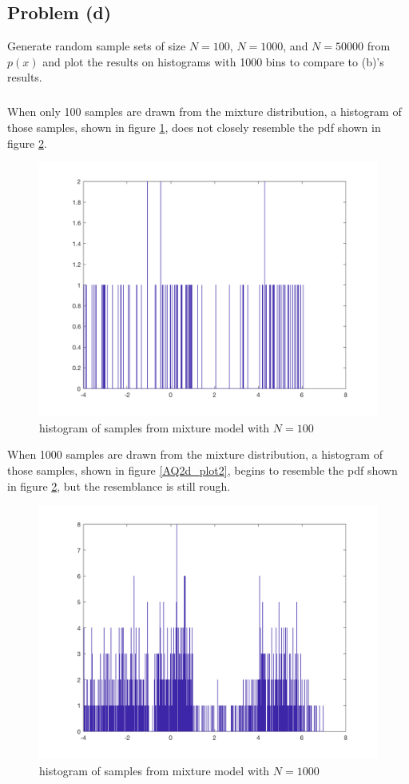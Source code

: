 \documentclass[11pt]{article}
\begin{document}
\subsection*{Problem (d)}
Generate random sample sets of size $N=100$, $N=1000$, and $N=50000$ from $p(x)$ and plot the results on histograms with 1000 bins to compare to (b)'s results.

\subparagraph*{}
When only 100 samples are drawn from the mixture distribution, a histogram of those samples, shown in figure \ref{AQ2d_plot1}, does not closely resemble the pdf shown in figure \ref{AQ2_plot1}.
\begin{figure}[h!]
	\centering
	\includegraphics[width=0.6\linewidth]{AQ2d_plot1.png}
	\caption{histogram of samples from mixture model with $N=100$}
	\label{AQ2d_plot1}
\end{figure}

When 1000 samples are drawn from the mixture distribution, a histogram of those samples, shown in figure \ref{AQ2d_plot2}, begins to resemble the pdf shown in figure \ref{AQ2_plot1}, but the resemblance is still rough.
\begin{figure}[h!]
	\centering
	\includegraphics[width=0.6\linewidth]{AQ2d_plot2.png}
	\caption{histogram of samples from mixture model with $N=1000$}
	\label{AQ2_plot1}
\end{figure}
\end{document}
